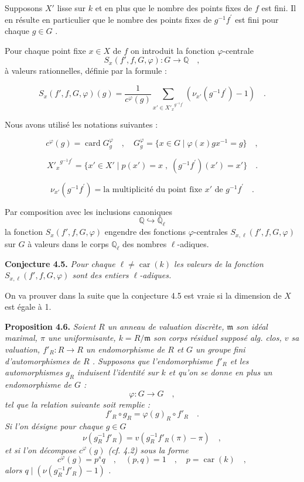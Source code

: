 \documentclass[11pt]{article}
\providecommand{\fm}{\mathfrak{m}}
\newcommand{\car}{\operatorname{car}}
\providecommand{\car}{\operatorname{car}}
\providecommand{\car}{\operatorname{car}}
\providecommand{\bQ}{\mathbb Q}
\providecommand{\fm}{\mathfrak m}
\providecommand{\card}{\operatorname{card}}
\providecommand{\car}{\operatorname{car}}
\begin{document}
Supposons $X'$ lisse sur $k$ et en plus que le nombre des points fixes de $f$ est fini. Il en résulte en particulier que le nombre des points fixes de $g^{-1}f^{\prime}$ est fini pour chaque $g \in G$ .

Pour chaque point fixe $x \in X$ de $f$ on introduit la fonction $\varphi$-centrale
\[
S_x(f',f,G,\varphi) : G \longrightarrow \bQ \quad ,
\]
à valeurs rationnelles, définie par la formule :

\begin{equation}\tag{4.1}
S_x(f',f,G,\varphi)(g) = \frac{1}{c^\varphi(g)} \sum_{x' \in {X'_x}^{g^{-1}f^{\prime}}} (\nu_{x'}(g^{-1}f^{\prime}) - 1) \quad .
\end{equation}

Nous avons utilisé les notations suivantes :

\begin{equation}\tag{4.2}
c^\varphi(g) = \card G_g^\varphi \quad , \quad G_g^\varphi = \{ x \in G \mid \varphi(x)gx^{-1} = g \} \quad ,
\end{equation}

\begin{equation}\tag{4.3}
{X'_x}^{g^{-1}f^{\prime}} = \{ x' \in X' \mid p(x') = x \; , \; (g^{-1}f^{\prime})(x') = x' \} \quad .
\end{equation}

\begin{equation}\tag{4.4}
\nu_{x'}(g^{-1}f^{\prime}) = \text{la multiplicité du point fixe } x' \text{ de } g^{-1}f^{\prime} \quad .
\end{equation}

Par composition avec les inclusions canoniques
\[
\bQ \hookrightarrow \bQ_\ell
\]
la fonction $S_x(f',f,G,\varphi)$ engendre des fonctions $\varphi$-centrales $S_{x,\ell}(f',f,G,\varphi)$ sur $G$ à valeurs dans le corps $\bQ_\ell$ des nombres $\ell$-adiques.

\medskip
\noindent
\textbf{Conjecture 4.5.} \emph{Pour chaque $\ell \neq \car(k)$ les valeurs de la fonction $S_{x,\ell}(f',f,G,\varphi)$ sont des entiers $\ell$-adiques.}

\medskip

On va prouver dans la suite que la conjecture 4.5 est vraie si la dimension de $X$ est égale à 1.

\medskip
\noindent
\textbf{Proposition 4.6.} \emph{Soient $R$ un anneau de valuation discrète, $\fm$ son idéal maximal, $\pi$ une uniformisante, $k = R/\fm$ son corps résiduel supposé alg. clos, $v$ sa valuation, $f'_R : R \to R$ un endomorphisme de $R$ et $G$ un groupe fini d'automorphismes de $R$ . Supposons que l'endomorphisme $f'_R$ et les automorphismes $g_R$ induisent l'identité sur $k$ et qu'on se donne en plus un endomorphisme de $G$ :
\[
\varphi : G \longrightarrow G \quad ,
\]
tel que la relation suivante soit remplie :
\[
f'_R \circ g_R = \varphi(g)_R \circ f'_R \quad .
\]
Si l'on désigne pour chaque $g \in G$
\[
\nu(g_R^{-1}f'_R) = v(g_R^{-1}f'_R(\pi) - \pi) \quad ,
\]
et si l'on décompose $c^\varphi(g)$ (cf. 4.2) sous la forme
\[
c^\varphi(g) = p^s q \quad , \quad (p,q) = 1 \quad , \quad p = \car(k) \quad ,
\]
alors $q \mid (\nu(g_R^{-1}f'_R) - 1)$ .}
\end{document}
